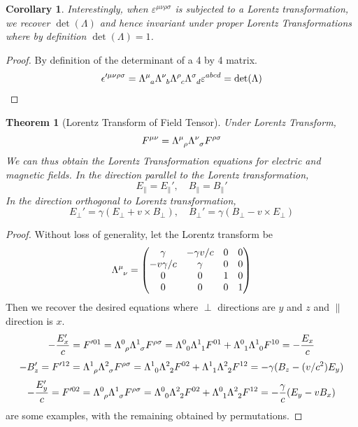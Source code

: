 \documentclass[a4paper]{article}
\theoremstyle{new}
\newtheorem{thm}{Theorem}[section]
\newtheorem{cor}{Corollary}[section]
\begin{document}
\begin{cor}
Interestingly, when $\varepsilon^{\mu\nu\rho\sigma}$ is subjected to a Lorentz transformation, we recover $\det(
\Lambda)$ and hence invariant under proper Lorentz Transformations where by definition $\det(\Lambda)=1$.
\end{cor}
\begin{proof}
By definition of the determinant of a 4 by 4 matrix.
$$\epsilon'^{\mu\nu\rho\sigma}=\tensor*{\Lambda}{*_{}^{\mu}_{a}}\tensor*{\Lambda}{*_{}^{\nu}_{b}}\tensor*{\Lambda}{*_{}^{\rho}_{c}}\tensor*{\Lambda}{*_{}^{\sigma}_{d}}\varepsilon^{abcd}=\det(\Lambda)$$
\end{proof}
\begin{thm}[Lorentz Transform of Field Tensor]
Under Lorentz Transform,
$$F^{\mu\nu}=\tensor*{\Lambda}{*_{}^{\mu}_{\rho}}\tensor*{\Lambda}{*_{}^{\nu}_{\sigma}} F^{\rho\sigma}$$
We can thus obtain the Lorentz Transformation equations for electric and magnetic fields. In the direction parallel to the Lorentz transformation,
$$E_\parallel=E_\parallel', \quad B_\parallel=B_\parallel'$$
In the direction orthogonal to Lorentz transformation,
$$E_\perp'=\gamma(E_\perp+v\times B_\perp),\quad B_\perp'=\gamma(B_\perp-v\times E_\perp)$$
\end{thm}
\begin{proof}
Without loss of generality, let the Lorentz transform be
$$\tensor*{\Lambda}{*_{}^{\mu}_{\nu}}=\begin{pmatrix}
\gamma &-\gamma v/c&0&0\\
-v\gamma/c&\gamma&0&0\\
0&0&1&0\\
0&0&0&1\\
\end{pmatrix}$$
Then we recover the desired equations where $\perp$ directions are $y$ and $z$ and $\parallel$ direction is $x$.
$$-\frac{E_x'}{c}=F'^{01}=\tensor*{\Lambda}{*_{}^{0}_{\rho}}\tensor*{\Lambda}{*_{}^{1}_{\sigma}}F^{\rho\sigma}=\tensor*{\Lambda}{*_{}^{0}_{0}}\tensor*{\Lambda}{*_{}^{1}_{1}}F^{01}+\tensor*{\Lambda}{*_{}^{0}_{1}}\tensor*{\Lambda}{*_{}^{1}_{0}}F^{10}=-\frac{E_x}{c}$$
$$-B_z'=F'^{12}=\tensor*{\Lambda}{*_{}^{1}_{\rho}}\tensor*{\Lambda}{*_{}^{2}_{\sigma}}F^{\rho\sigma}=\tensor*{\Lambda}{*_{}^{1}_{0}}\tensor*{\Lambda}{*_{}^{2}_{2}}F^{02}+\tensor*{\Lambda}{*_{}^{1}_{1}}\tensor*{\Lambda}{*_{}^{2}_{2}}F^{12}=-\gamma(B_z-(v/c^2)E_y)$$
$$-\frac{E_y'}{c}=F'^{02}=\tensor*{\Lambda}{*_{}^{0}_{\rho}}\tensor*{\Lambda}{*_{}^{1}_{\sigma}}F^{\rho\sigma}=\tensor*{\Lambda}{*_{}^{0}_{0}}\tensor*{\Lambda}{*_{}^{2}_{2}}F^{02}+\tensor*{\Lambda}{*_{}^{0}_{1}}\tensor*{\Lambda}{*_{}^{2}_{2}}F^{12}=-\frac{\gamma}{c}(E_y-vB_x)$$
are some examples, with the remaining obtained by permutations.
\end{proof}
\end{document}
